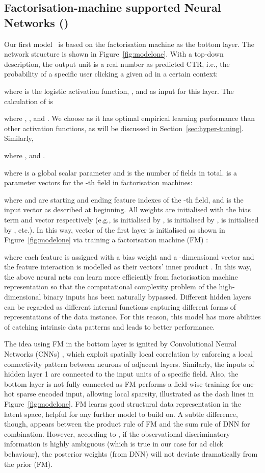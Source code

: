 \documentclass{llncs}
\newcommand{\fmnn}{\text{FNN}}
\begin{document}
\subsection{Factorisation-machine supported Neural Networks (\fmnn)}\label{sec:fmnn}
Our first model \fmnn~is based on the factorisation machine as the bottom layer. The network structure is shown in Figure~\ref{fig:modelone}. With a top-down description, the output unit is a real number  as predicted CTR, i.e., the probability of a specific user clicking a given ad in a certain context:

where  is the logistic activation function, ,   and  as input for this layer. The calculation of  is

where , ,  and . We choose  as it has optimal empirical learning performance than other activation functions, as will be discussed in Section~\ref{sec:hyper-tuning}. Similarly,

where ,  and .

where  is a global scalar parameter and  is the number of fields in total.  is a parameter vectors for the -th field in factorisation machines:

where  and  are starting and ending feature indexes of the -th field,  and  is the input vector as described at beginning. All weights  are initialised with the bias term  and vector  respectively (e.g.,  is initialised by ,  is initialised by ,  is initialised by , etc.). In this way,  vector of the first layer is initialised as shown in Figure~\ref{fig:modelone} via training a factorisation machine (FM) \cite{rendle2012factorization}:

where each feature  is assigned with a bias weight  and a -dimensional vector  and the feature interaction is modelled as their vectors' inner product . In this way, the above neural nets can learn more efficiently from factorisation machine representation so that the computational complexity problem of the high-dimensional binary inputs has been naturally bypassed. Different hidden layers can be regarded as different internal functions capturing different forms of representations of the data instance. For this reason, this model has more abilities of catching intrinsic data patterns and leads to better performance.

The idea using FM in the bottom layer is ignited by Convolutional Neural Networks (CNNs) \cite{fukushima1980neocognitron}, which exploit spatially local correlation by enforcing a local connectivity pattern between neurons of adjacent layers.  Similarly, the inputs of hidden layer 1 are connected to the input units of a specific field. Also, the bottom layer is not fully connected as FM performs a field-wise training for one-hot sparse encoded input, allowing local sparsity, illustrated as the dash lines in Figure~\ref{fig:modelone}.  FM learns good structural data representation in the latent space, helpful for any further model to build on.  A subtle difference, though, appears between the product rule of FM and the sum rule of DNN for combination. However, according to \cite{kittler1998combining}, if the observational discriminatory information is highly ambiguous (which is true in our case for ad click behaviour), the posterior weights (from DNN) will not deviate dramatically from the prior (FM).
\end{document}
